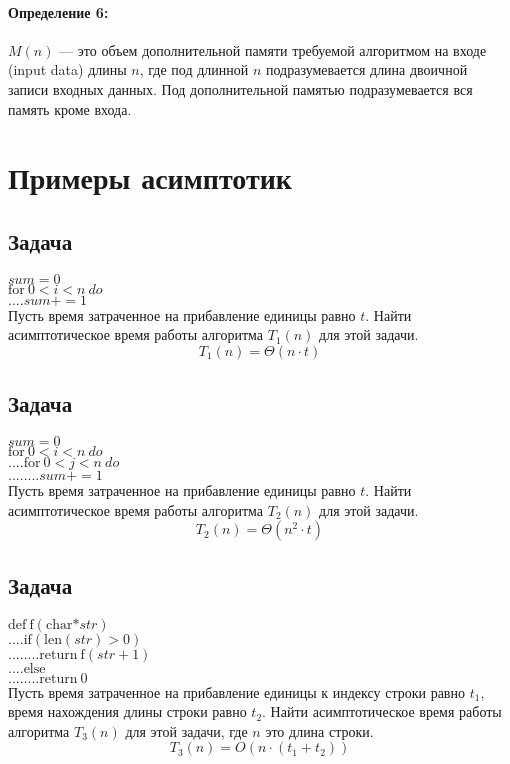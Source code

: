\documentclass[12pt, twoside]{article}
\begin{document}
\paragraph{Определение 6:} $M(n)$ --- это объем дополнительной памяти требуемой алгоритмом на входе (input data)  длины $n$, где под длинной $n$ подразумевается длина двоичной записи входных данных. Под дополнительной памятью подразумевается  вся память кроме входа.

\section{Примеры асимптотик}

\subsection{Задача}
$sum = 0$\\
$\text{for}~0<i<n~do$\\
$....sum += 1$\\

Пусть время затраченное на прибавление единицы равно $t$. Найти асимптотическое время работы алгоритма  $T_1(n)$ для этой задачи.
$$T_1(n) = \Theta(n\cdot t)$$

\subsection{Задача}
$sum = 0$\\
$\text{for}~0<i<n~do$\\
$....\text{for}~0<j<n~do$\\
$........sum += 1$\\

Пусть время затраченное на прибавление единицы равно $t$. Найти асимптотическое время работы алгоритма  $T_2(n)$ для этой задачи.
$$T_2(n) = \Theta(n^2\cdot t)$$

\subsection{Задача}
$\text{def}~\text{f}(\text{char*} str)$\\
$....\text{if}(\text{len}(str) > 0)$\\
$........\text{return}~\text{f}(str + 1)$\\
$....\text{else}$\\
$........\text{return}~0$\\

Пусть время затраченное на прибавление единицы к индексу строки равно $t_1$, время нахождения длины строки равно $t_2$. Найти асимптотическое время работы алгоритма  $T_3(n)$ для этой задачи, где $n$ это  длина строки.
$$T_3(n) = O(n\cdot (t_1+t_2))$$
\end{document}
